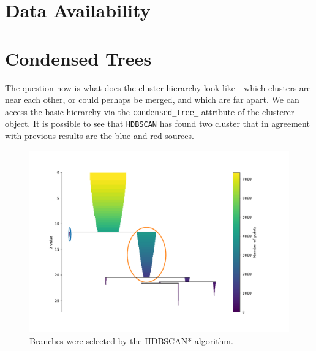 \documentclass[fleqn,usenatbib]{mnras}
\begin{document}
\section*{Data Availability}









\appendix
\section{Condensed Trees}
\label{sec:trees}

The question now is what does the cluster hierarchy look like - which
clusters are near each other, or could perhaps be merged, and which
are far apart. We can access the basic hierarchy via the \texttt{condensed\_tree\_}
attribute of the clusterer object. It is possible to see that \texttt{HDBSCAN} has found
two cluster that in agreement with previous results are the blue and red sources.

\begin{figure}
	\includegraphics[width=0.9\linewidth]{Figs/cluster-hierarchy-hdbscan.pdf}
        \caption{Branches were selected by the HDBSCAN* algorithm.}
    \label{fig:treess}
\end{figure}


\newcommand\TableHeader{
  \hline\hline
  Id Object & \(\mathrm{RA}\) & \(\mathrm{Dec}\) & Type & Redshift & Group & P(Blue) &  P(Red)\\
            &                 &                  &      &          &{\sc hac}& {\sc hdbscan}& {\sc hdbscan} \\
  \hline 
}
\end{document}
